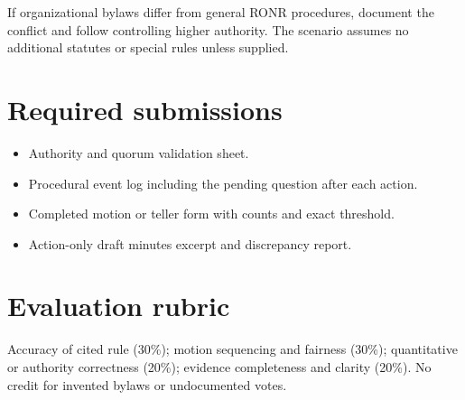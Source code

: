\documentclass[11pt]{article}
\begin{document}
If organizational bylaws differ from general RONR procedures, document the conflict and follow controlling higher authority. The scenario assumes no additional statutes or special rules unless supplied.

\section{Required submissions}
\begin{itemize}[leftmargin=*,itemsep=4pt]
\item Authority and quorum validation sheet.
\item Procedural event log including the pending question after each action.
\item Completed motion or teller form with counts and exact threshold.
\item Action-only draft minutes excerpt and discrepancy report.
\end{itemize}

\section{Evaluation rubric}
Accuracy of cited rule (30\%); motion sequencing and fairness (30\%); quantitative or authority correctness (20\%); evidence completeness and clarity (20\%). No credit for invented bylaws or undocumented votes.
\end{document}

